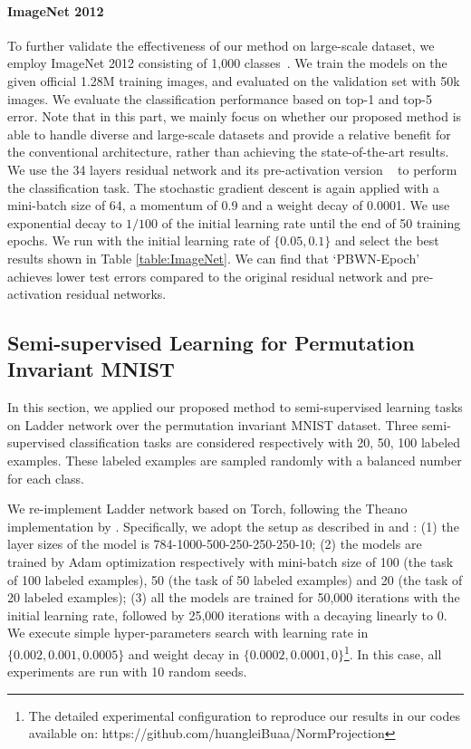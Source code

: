 \documentclass[twocolumn]{article}
\begin{document}
\paragraph{ImageNet 2012}
To further validate the effectiveness of our method on large-scale dataset, we employ ImageNet 2012 consisting of 1,000 classes~\cite{2009_ImageNet}. We train the models on the given official 1.28M  training images, and evaluated on the validation set with 50k images. We evaluate the classification performance based on top-1 and top-5 error. Note that in this part, we mainly focus on whether our proposed method is able to handle diverse and large-scale datasets and provide a relative benefit for the conventional architecture, rather than achieving the state-of-the-art results. We use the 34 layers residual network \cite{2015_CVPR_He} and its pre-activation version ~\cite{2016_CoRR_He} to perform the classification task. The stochastic gradient descent is again applied with a mini-batch size of 64, a momentum of 0.9 and a weight decay of 0.0001. We use exponential decay to $1/100$ of the initial learning rate until the end of 50 training epochs.  We run with the initial learning rate of $\{0.05, 0.1\}$ and select the best results shown in Table \ref{table:ImageNet}. We can find that `PBWN-Epoch' achieves lower test errors compared to the original residual network and pre-activation residual networks.


\subsection{Semi-supervised Learning for Permutation Invariant MNIST }
In this section, we applied our proposed method to semi-supervised learning tasks on Ladder network \cite{2015_NIPS_Rasmus} over the permutation invariant MNIST dataset. Three semi-supervised classification tasks are considered respectively with 20, 50, 100 labeled examples. These labeled examples are sampled randomly with a balanced number for each class.

We re-implement Ladder network based on Torch, following the Theano implementation by \cite{2015_NIPS_Rasmus}. Specifically, we adopt the setup as described in \cite{2015_NIPS_Rasmus} and \cite{2016_ICML_Pezeshki}: (1) the layer sizes of the model is 784-1000-500-250-250-250-10; (2) the models are trained by Adam optimization \cite{2014_CoRR_Kingma} respectively with mini-batch size of 100 (the task of 100  labeled examples), 50 (the task of 50 labeled examples) and 20 (the task of 20 labeled examples); (3) all the models are trained for 50,000 iterations with the initial learning rate, followed by 25,000 iterations with a decaying linearly to 0. We execute simple hyper-parameters search with learning rate in $\{0.002, 0.001, 0.0005 \}$ and weight decay in $\{0.0002, 0.0001, 0\}$\footnote{The detailed experimental configuration  to reproduce our results in our codes available on: https://github.com/huangleiBuaa/NormProjection}. In this case, all experiments are run with 10 random seeds.
\end{document}
